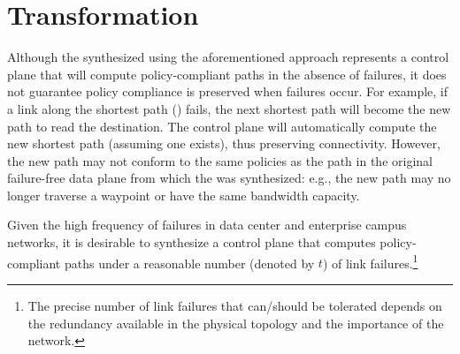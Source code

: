 \section{\ARC Transformation}
Although the \ARC synthesized using the aforementioned approach represents a
control plane that will compute policy-compliant paths in the absence of
failures, it does not guarantee policy compliance is preserved when failures
occur. For example, if a link along the shortest path () fails, the next shortest path will become the new path to
read the destination. The control plane will automatically compute the new
shortest path (assuming one exists), thus preserving connectivity. However,
the new path may not conform to the same policies as the path in the original
failure-free data plane from which the \ARC was synthesized: e.g., the new
path may no longer traverse a waypoint or have the same bandwidth capacity.

Given the high frequency of failures in data center and enterprise campus
networks, it is desirable to synthesize a control plane that computes
policy-compliant paths under a reasonable number (denoted by $t$) of link
failures.\footnote{The precise number of link failures that can/should be
tolerated depends on the redundancy available in the physical topology and the
importance of the network.}  
